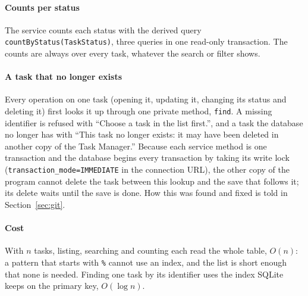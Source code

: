 \paragraph*{Counts per status} The service counts each status with the derived query
\texttt{countByStatus(TaskStatus)}, three queries in one read-only transaction. The counts are always over every task,
whatever the search or filter shows.

\paragraph*{A task that no longer exists} Every operation on one task (opening it, updating it, changing its status
and deleting it) first looks it up through one private method, \texttt{find}. A missing identifier is refused with ``Choose a task in
the list first.'', and a task the database no longer has with ``This task no longer exists: it may have been deleted
in another copy of the Task Manager.'' Because each service method is one transaction and the
database begins every transaction by taking its write lock (\texttt{transaction\_mode=IMMEDIATE} in the connection
URL), the other copy of the program cannot delete the task between this lookup and the save that follows it; its
delete waits until the save is done. How this was found and fixed is told in Section~\ref{sec:git}.

\paragraph*{Cost} With $n$ tasks, listing, searching and counting each read the whole table, $O(n)$: a pattern that
starts with \texttt{\%} cannot use an index, and the list is short enough that none is needed. Finding one task by its
identifier uses the index SQLite keeps on the primary key, $O(\log n)$.
